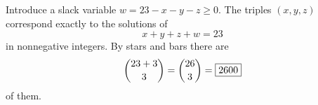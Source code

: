 Introduce a slack variable $w=23-x-y-z\ge0$. The triples $(x,y,z)$ correspond exactly to the solutions of
\[x+y+z+w=23\]
in nonnegative integers. By stars and bars there are
\[\dbinom{23+3}{3}=\dbinom{26}{3}=\boxed{2600}\]
of them.
